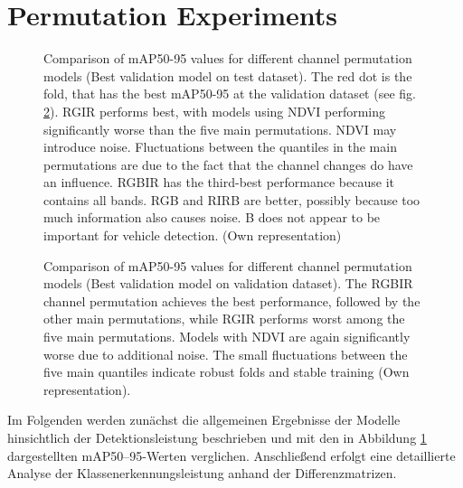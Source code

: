 \section{Permutation Experiments}
\begin{figure}[t]
    \centering
    
    \caption[Comparison of \acrshort{mAP}50-95 values for different channel permutation models (Best validation model on test dataset)]{Comparison of \acrshort{mAP}50-95 values for different channel permutation models (Best validation model on test dataset). The red dot is the fold, that has the best \acrshort{mAP}50-95 at the validation dataset (see fig. \ref{fig:perm_exp_map50-95:val_on_val}). \acrshort{RGIR} performs best, with models using \acrshort{NDVI} performing significantly worse than the five main permutations. \acrshort{NDVI} may introduce noise. Fluctuations between the quantiles in the main permutations are due to the fact that the channel changes do have an influence. \acrshort{RGBIR} has the third-best performance because it contains all bands. \acrshort{RGB} and \acrshort{RIRB} are better, possibly because too much information also causes noise. \Acrlong{B} does not appear to be important for vehicle detection. (Own representation)}
    \label{fig:perm_exp_map50-95:val_on_test}
\end{figure}

\begin{figure}[b]
    \centering
    
    \caption[Comparison of \acrshort{mAP}50-95 values for different channel permutation models (Best validation model on validation dataset)]{Comparison of \acrshort{mAP}50-95 values for different channel permutation models (Best validation model on validation dataset). The RGBIR channel permutation achieves the best performance, followed by the other main permutations, while RGIR performs worst among the five main permutations. Models with NDVI are again significantly worse due to additional noise. The small fluctuations between the five main quantiles indicate robust folds and stable training (Own representation).}
    \label{fig:perm_exp_map50-95:val_on_val}
\end{figure}
Im Folgenden werden zunächst die allgemeinen Ergebnisse der Modelle hinsichtlich der Detektionsleistung beschrieben und mit den in Abbildung \ref{fig:perm_exp_map50-95:val_on_test} dargestellten \acrshort{mAP}50--95-Werten verglichen. Anschließend erfolgt eine detaillierte Analyse der Klassenerkennungsleistung anhand der Differenzmatrizen.  

